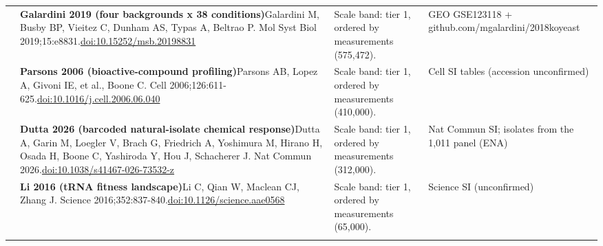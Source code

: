 \begin{landscape}
\begin{longtable}{@{}r@{\hspace{4pt}} L{86mm} L{92mm} L{62mm}@{}}
 & \textbf{Galardini 2019 (four backgrounds x 38 conditions)}\newline Galardini M, Busby BP, Vieitez C, Dunham AS, Typas A, Beltrao P. Mol Syst Biol 2019;15:e8831.\newline \href{https://doi.org/10.15252/msb.20198831}{doi:10.15252/\allowbreak msb.20198831} & Scale band: tier 1, ordered by measurements (575,472). & GEO GSE123118 + github.com/\allowbreak mgalardini/\allowbreak 2018koyeast \\
 & \textbf{Parsons 2006 (bioactive-compound profiling)}\newline Parsons AB, Lopez A, Givoni IE, et al., Boone C. Cell 2006;126:611-625.\newline \href{https://doi.org/10.1016/j.cell.2006.06.040}{doi:10.1016/\allowbreak j.cell.2006.06.040} & Scale band: tier 1, ordered by measurements (410,000). & Cell SI tables (accession unconfirmed) \\
 & \textbf{Dutta 2026 (barcoded natural-isolate chemical response)}\newline Dutta A, Garin M, Loegler V, Brach G, Friedrich A, Yoshimura M, Hirano H, Osada H, Boone C, Yashiroda Y, Hou J, Schacherer J. Nat Commun 2026.\newline \href{https://doi.org/10.1038/s41467-026-73532-z}{doi:10.1038/\allowbreak s41467-026-73532-z} & Scale band: tier 1, ordered by measurements (312,000). & Nat Commun SI; isolates from the 1,011 panel (ENA) \\
 & \textbf{Li 2016 (tRNA fitness landscape)}\newline Li C, Qian W, Maclean CJ, Zhang J. Science 2016;352:837-840.\newline \href{https://doi.org/10.1126/science.aae0568}{doi:10.1126/\allowbreak science.aae0568} & Scale band: tier 1, ordered by measurements (65,000). & Science SI (unconfirmed) \\
\addlinespace[5pt]
\end{longtable}
\endgroup
\end{landscape}
